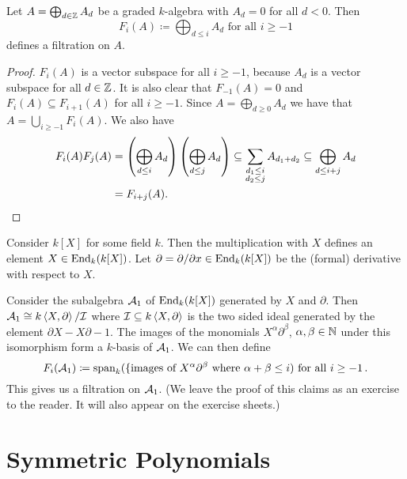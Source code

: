 \begin{lem}
  Let $A = \bigoplus_{d \in \mathbb{Z}} A_d$ be a graded $k$-algebra with $A_d = 0$ for all $d < 0$.
  Then
  \[
              F_i(A)
    \coloneqq \bigoplus_{d \leq i} A_d
    \text{ for all }
    i \geq -1
  \]
  defines a filtration on $A$.
\end{lem}
\begin{proof}
  $F_i(A)$ is a vector subspace for all $i \geq -1$, because $A_d$ is a vector subspace for all $d \in \mathbb{Z}$.
  It is also clear that $F_{-1}(A) = 0$ and $F_i(A) \subseteq F_{i+1}(A)$ for all $i \geq -1$.
  Since $A = \bigoplus_{d \geq 0} A_d$ we have that $A = \bigcup_{i \geq -1} F_i(A)$.
  We also have
  \begin{align*}
              F_i(A) F_j(A)
    &=        \left( \bigoplus_{d \leq i} A_d \right) \left( \bigoplus_{d \leq j} A_d \right)
    \subseteq \sum_{\substack{d_1 \leq i \\ d_2 \leq j}} A_{d_1 + d_2}
    \subseteq \bigoplus_{d \leq i+j} A_d \\
    &=        F_{i+j}(A).
    \qedhere
  \end{align*}
\end{proof}


\begin{expl}
  Consider $k[X]$ for some field $k$.
  Then the multiplication with $X$ defines an element $X \in \operatorname{End}_k(k[X])$.
  Let $\partial = \partial/\partial x \in \operatorname{End}_k(k[X])$ be the (formal) derivative with respect to $X$.
  
  Consider the subalgebra $\mathcal{A}_1$ of $\operatorname{End}_k(k[X])$ generated by $X$ and $\partial$.
  Then $\mathcal{A}_1 \cong k\left\langle X,\partial \right\rangle/\mathcal{I}$ where $\mathcal{I} \subseteq k \left\langle X,\partial \right\rangle$ is the two sided ideal generated by the element $\partial X - X \partial - 1$.
  The images of the monomials $X^\alpha \partial^\beta$, $\alpha, \beta \in \mathbb{N}$ under this isomorphism form a $k$-basis of $\mathcal{A}_1$.
  We can then define
  \[
              F_i(\mathcal{A}_1)
    \coloneqq \operatorname{span}_k( \{\text{images of $X^\alpha \partial^\beta$ where $\alpha+\beta \leq i$})
    \text{ for all }
    i \geq -1 \,.
  \]
  This gives us a filtration on $\mathcal{A}_1$.
  (We leave the proof of this claims as an exercise to the reader. It will also appear on the exercise sheets.)
\end{expl}





\section{Symmetric Polynomials}


